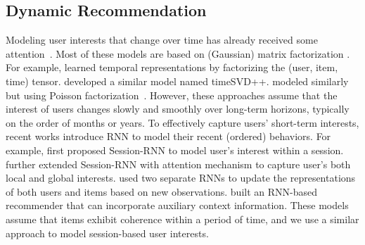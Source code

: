 \documentclass[sigconf]{acmart}
\begin{document}
\subsection{Dynamic Recommendation}
Modeling user interests that change over time has already received some attention~\cite{xiong2010temporal,koren2010collaborative,charlin2015dynamic}.
Most of these models are based on (Gaussian) matrix factorization \cite{mnih2008probabilistic}.
For example, \citet{xiong2010temporal} learned temporal representations by factorizing the (user, item, time) tensor. \citet{koren2010collaborative} developed a similar model named timeSVD++. \citet{charlin2015dynamic} modeled similarly but using Poisson factorization~\cite{gopalan2015scalable}. 
However, these approaches assume that the interest of users changes slowly and smoothly over long-term horizons, typically on the order of months or years.
To effectively capture users' short-term interests, recent works introduce RNN to model their recent (ordered) behaviors. For example, \citet{hidasi2016session} first proposed Session-RNN to model user's interest within a session. \citet{li2017neural} further extended Session-RNN with attention mechanism to capture user's both local and global interests. \citet{wu2017recurrent} used two separate RNNs to update the representations of both users and items based on new observations. \citet{beutel2018latent} built an RNN-based recommender that can incorporate auxiliary context information. These models assume that items exhibit coherence within a period of time, and we use a similar approach to model session-based user interests.
\end{document}
